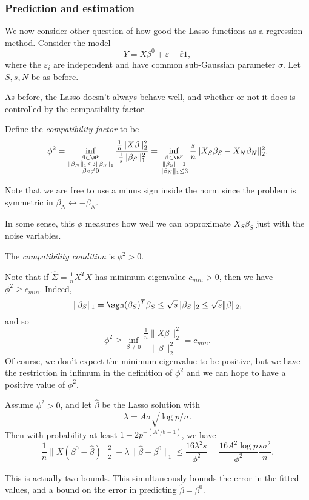 \documentclass[a4paper]{article}
\begin{document}
\subsubsection*{Prediction and estimation}
We now consider other question of how good the Lasso functions as a regression method. Consider the model
\[
  Y = X \beta^0 + \varepsilon - \bar{\varepsilon} 1,
\]
where the $\varepsilon_i$ are independent and have common sub-Gaussian parameter $\sigma$. Let $S, s, N$ be as before.

As before, the Lasso doesn't always behave well, and whether or not it does is controlled by the compatibility factor.

\begin{defi}
  Define the \emph{compatibility factor} to be
  \[
    \phi^2 = \inf_{\substack{\beta \in \R^p\\ \|\beta_N\|_1 \leq 3 \|\beta_S\|_1\\ \beta_S \not= 0}} \frac{\frac{1}{n} \|X \beta\|_2^2}{ \frac{1}{s} \|\beta_S\|^2_1} = \inf_{\substack{\beta \in \R^p\\ \|\beta_S\| = 1\\ \|\beta_N\|_1 \leq 3}} \frac{s}{n} \|X_S \beta_S - X_N \beta_N\|_2^2.
  \]
\end{defi}
Note that we are free to use a minus sign inside the norm since the problem is symmetric in $\beta_N \leftrightarrow -\beta_N$.

In some sense, this $\phi$ measures how well we can approximate $X_S \beta_S$ just with the noise variables.
\begin{defi}
  The \emph{compatibility condition} is $\phi^2 > 0$.
\end{defi}

Note that if $\hat{\Sigma} = \frac{1}{n} X^T X$ has minimum eigenvalue $c_{min} > 0$, then we have $\phi^2 \geq c_{min}$. Indeed,
\[
  \|\beta_S\|_1 = \sgn (\beta_S)^T \beta_S \leq \sqrt{s} \|\beta_S\|_2 \leq \sqrt{s} \|\beta\|_2,
\]
and so
\[
  \phi^2 \geq \inf_{\beta \not= 0} \frac{\frac{1}{n} \|X \beta\|_2^2}{\|\beta\|_2^2} = c_{min}.
\]
Of course, we don't expect the minimum eigenvalue to be positive, but we have the restriction in infimum in the definition of $\phi^2$ and we can hope to have a positive value of $\phi^2$.

\begin{thm}
  Assume $\phi^2 > 0$, and let $\hat{\beta}$ be the Lasso solution with
  \[
    \lambda = A \sigma \sqrt{\log p/n}.
  \]
  Then with probability at least $1 - 2p^{-(A^2/8 - 1)}$, we have
  \[
    \frac{1}{n} \|X (\beta^0 - \hat{\beta})\|_2^2 + \lambda\|\hat{\beta} - \beta^0\|_1 \leq \frac{16 \lambda^2 s}{\phi^2} = \frac{16 A^2 \log p}{\phi^2} \frac{s \sigma^2}{n}.
  \]
\end{thm}
This is actually two bounds. This simultaneously bounds the error in the fitted values, and a bound on the error in predicting $\hat{\beta} - \beta^0$.
\end{document}
